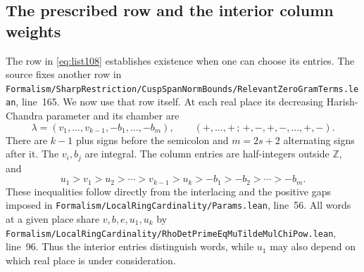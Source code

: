 \documentclass[a4paper,11pt]{article}
\theoremstyle{definition}
\theoremstyle{remark}
\newcommand{\ZZ}{\mathbb Z}\newcommand{\ord}{\operatorname{ord}}
\newcommand{\srcloc}[2]{{\small\nolinkurl{#1.lean}}, line~#2}
\numberwithin{equation}{section}
\begin{document}
\subsection{The prescribed row and the interior column weights}\label{nav:VII-19}
The row in \eqref{eq:list108} establishes existence when one can
choose its entries. The source fixes another row in
\srcloc{Formalism/SharpRestriction/CuspSpanNormBounds/RelevantZeroGramTerms}{165}.
We now use that row itself. At each real place its decreasing
Harish-Chandra parameter and its chamber are
\begin{equation}
      \lambda=(v_1,\ldots,v_{k-1},-b_1,\ldots,-b_m),
      \qquad (+,\ldots,+\,;\,+,-,+,-,\ldots,+,-).
      \label{eq:src109}
\end{equation}
There are \(k-1\) plus signs before the semicolon and \(m=2s+2\)
alternating signs after it. The \(v_i,b_j\) are integral.
The column entries are half-integers outside \(\ZZ\), and
\[
         u_1>v_1>u_2>\cdots>v_{k-1}>u_k>-b_1>
                         -b_2>\cdots>-b_m .
\]
These inequalities follow directly from the interlacing and
the positive gaps imposed in
\srcloc{Formalism/LocalRingCardinality/Params}{56}.
All words at a given place share \(v,b,e,u_1,u_k\) by
\srcloc{Formalism/LocalRingCardinality/RhoDetPrimeEqMuTildeMulChiPow}{96}.
Thus the interior entries distinguish words, while \(u_1\) may
also depend on which real place is under consideration.
\end{document}
